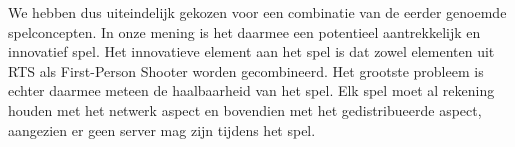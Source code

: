     We hebben dus uiteindelijk gekozen voor een combinatie van de eerder genoemde spelconcepten. In onze mening is het daarmee een potentieel aantrekkelijk en innovatief spel. Het innovatieve element aan het spel is dat zowel elementen uit RTS als First-Person Shooter worden gecombineerd. Het grootste probleem is echter daarmee meteen de haalbaarheid van het spel. Elk spel moet al rekening houden met het netwerk aspect en bovendien met het gedistribueerde aspect, aangezien er geen server mag zijn tijdens het spel.  